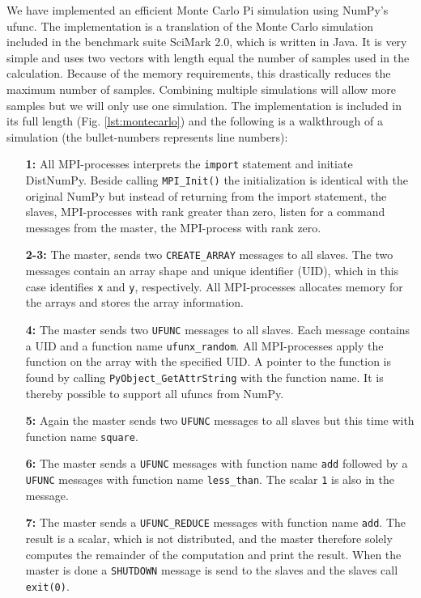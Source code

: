 \documentclass[10pt]{article}
\begin{document}
We have implemented an efficient Monte Carlo Pi simulation using NumPy's ufunc. The implementation is a translation of the Monte Carlo simulation included in the benchmark suite SciMark 2.0\cite{SciMark}, which is written in Java. It is very simple and uses two vectors with length equal the number of samples used in the calculation. Because of the memory requirements, this drastically reduces the maximum number of samples. Combining multiple simulations will allow more samples but we will only use one simulation. The implementation is included in its full length (Fig. \ref{lst:montecarlo}) and the following is a walkthrough of a simulation (the bullet-numbers represents line numbers):

\begin{enumerate}
\item[\textbf{1:}] All MPI-processes interprets the \texttt{import} statement and initiate DistNumPy. Beside calling \texttt{MPI\_Init()} the initialization is identical with the original NumPy but instead of returning from the import statement, the slaves, MPI-processes with rank greater than zero, listen for a command messages from the master, the MPI-process with rank zero.
\item[\textbf{2-3:}] The master, sends two \texttt{CREATE\_ARRAY} messages to all slaves. The two messages contain an array shape and unique identifier (UID), which in this case identifies \texttt{x} and \texttt{y}, respectively. All MPI-processes allocates memory for the arrays and stores the array information.
\item[\textbf{4:}] The master sends two \texttt{UFUNC} messages to all slaves. Each message contains a UID and a function name \texttt{ufunx\_random}. All MPI-processes apply the function on the array with the specified UID. A pointer to the function is found by calling \texttt{PyObject\_GetAttrString} with the function name. It is thereby possible to support all ufuncs from NumPy.
\item[\textbf{5:}] Again the master sends two \texttt{UFUNC} messages to all slaves but this time with function name \texttt{square}.
\item[\textbf{6:}] The master sends a \texttt{UFUNC} messages with function name \texttt{add} followed by a \texttt{UFUNC} messages with function name \texttt{less\_than}. The scalar \texttt{1} is also in the message.
\item[\textbf{7:}] The master sends a \texttt{UFUNC\_REDUCE} messages with function name \texttt{add}. The result is a scalar, which is not distributed, and the master therefore solely computes the remainder of the computation and print the result. When the master is done a \texttt{SHUTDOWN} message is send to the slaves and the slaves call \texttt{exit(0)}.
\end{enumerate}
\end{document}

